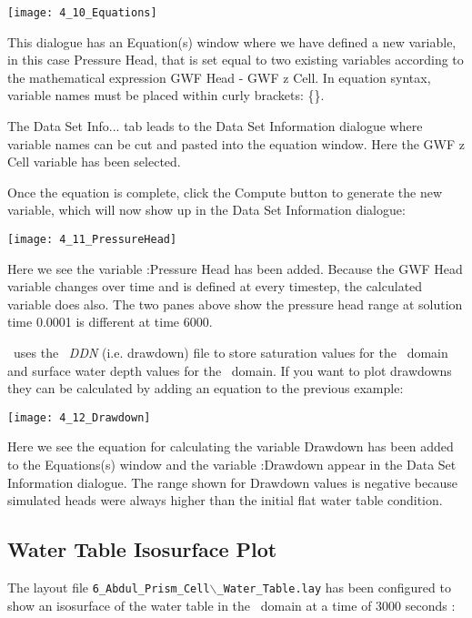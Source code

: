         \texttt{[image: 4\_10\_Equations]}

This dialogue has an {\sf Equation(s)} window where we have defined a new variable, in this case {\sf Pressure Head},  that is set equal to two existing variables according to the  mathematical expression {\sf GWF Head - GWF z Cell}.  In equation syntax, variable names must be placed within curly brackets: {\sf \{\}}.

The {\sf Data Set Info...} tab leads to the {\sf Data Set Information} dialogue where variable names can be cut and pasted into the equation window.  Here the {\sf GWF z Cell} variable has been selected.

Once the equation is complete, click the {\sf Compute} button to generate the new variable, which will now show up in the {\sf Data Set Information} dialogue:

        \texttt{[image: 4\_11\_PressureHead]}

Here we see the variable {:Pressure Head} has been added. Because the {\sf GWF Head} variable changes over time and is defined at every timestep, the calculated variable does also.  The two panes above show the pressure head range at solution time 0.0001 is different at time 6000.

\mfus\ uses the \mf\ {\it DDN} (i.e. drawdown) file to store saturation values for the \gwf\ domain and surface water depth values for the \swf\ domain. If you want to plot drawdowns they can be calculated by adding an equation to the previous example:

        \texttt{[image: 4\_12\_Drawdown]}

Here we see the equation for calculating the variable {\sf Drawdown} has been added to the {\sf Equations(s)} window and the variable {:Drawdown} appear in the {\sf Data Set Information} dialogue.  The range shown for {\sf Drawdown} values is negative because simulated heads were always higher than the initial flat water table condition.

\subsection{Water Table Isosurface Plot}
The layout file {\tt 6\_Abdul\_Prism\_Cell$\backslash$\_Water\_Table.lay} has been configured to show an isosurface of the water table in the \gwf\ domain at a time of 3000 seconds :

